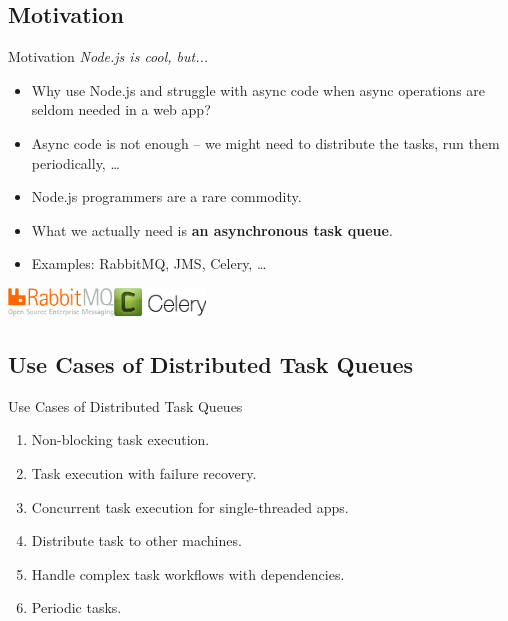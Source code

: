 \documentclass[xcolor=x11names,compress,t]{beamer}
\renewcommand{\(}{\begin{columns}[T]}
\renewcommand{\)}{\end{columns}}
\newcommand{\<}[1]{\begin{column}{#1}}
\renewcommand{\>}{\end{column}}
\newenvironment{slide}[1]{\subsection{#1} \begin{frame}{#1}}{\end{frame}}
\begin{document}
\begin{slide}{Motivation}
    \vspace{1em}
    \centering 
    {\large \emph{Node.js is cool, but...}}
    \vspace{1em}
    \begin{itemize} 
        \item Why use Node.js and struggle with async code when async operations are seldom needed in a web app?
        \item Async code is not enough -- we might need to distribute the tasks, run them periodically, \dots
        \item Node.js programmers are a rare commodity.
        \item What we actually need is \textbf{an asynchronous task queue}.
        \item Examples: RabbitMQ, JMS, Celery, \dots
    \end{itemize}

    \vspace{1em}
    \includegraphics[height=2em]{rabbitmq-logo}\hspace{2em}\includegraphics[height=2em]{celery-logo-long}
\end{slide}


\begin{slide}{Use Cases of Distributed Task Queues}
    \begin{enumerate}
        \item Non-blocking task execution.
        \item Task execution with failure recovery.
        \item Concurrent task execution for single-threaded apps.
        \item Distribute task to other machines.
        \item Handle complex task workflows with dependencies.
        \item Periodic tasks.
    \end{enumerate}
\end{slide}
\end{document}
